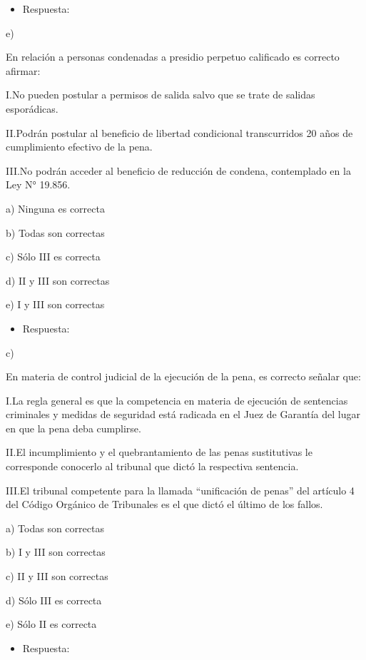 \documentclass[letterpaper, 11pt]{article}
\begin{document}
\begin{itemize}
\item Respuesta:
\end{itemize}

e)



En relación a personas condenadas a presidio perpetuo calificado es
correcto afirmar:


I.No pueden postular a permisos de salida salvo que se trate de
salidas esporádicas.

II.Podrán postular al beneficio de libertad condicional transcurridos
20 años de cumplimiento efectivo de la pena.

III.No podrán acceder al beneficio de reducción de condena,
contemplado en la Ley N° 19.856.


a) Ninguna es correcta

b) Todas son correctas

c) Sólo III es correcta

d) II y III son correctas

e) I y III son correctas


\begin{itemize}
\item Respuesta:
\end{itemize}

c)


En materia de control judicial de la ejecución de la pena, es correcto
señalar que:


I.La regla general es que la competencia en materia de ejecución de
sentencias criminales y medidas de seguridad está radicada en el Juez
de Garantía del lugar en que la pena deba cumplirse.

II.El incumplimiento y el quebrantamiento de las penas sustitutivas le
corresponde conocerlo al tribunal que dictó la respectiva sentencia.


III.El tribunal competente para la llamada “unificación de penas” del
artículo 4 del Código Orgánico de Tribunales es el que dictó el último
de los fallos.


a) Todas son correctas

b) I y III son correctas

c) II y III son correctas

d) Sólo III es correcta

e) Sólo II es correcta


\begin{itemize}
\item Respuesta:
\end{itemize}
\end{document}
